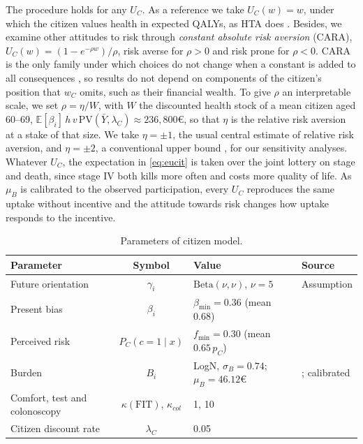 \documentclass[12pt]{article}
\begin{document}
The procedure holds for any $U_C$. As a reference we take $U_C(w) = w$, under which the citizen values health in expected QALYs, as HTA does \citep{pliskin1980utility, bleichrodt1997characterizing}. Besides, we examine other attitudes to risk through \emph{constant absolute risk aversion} (CARA), $U_C(w) = (1 - e^{-\rho w})/\rho$, risk averse for $\rho > 0$ and risk prone for $\rho < 0$. CARA is the only family under which choices do not change when a constant is added to all consequences \citep{pratt1978risk}, so results do not depend on components of the citizen's position that $w_C$ omits, such as their financial wealth. To give $\rho$ an interpretable scale, we set $\rho = \eta / W$, with $W$ the discounted health stock of a mean citizen aged 60--69, $\mathbb{E}[\beta_i]\, h\, v\, \mathrm{PV}(\bar Y, \lambda_C) \approx 236{,}800$€, so that $\eta$ is the relative risk aversion at a stake of that size. We take $\eta = \pm 1$, the usual central estimate of relative risk aversion, and $\eta = \pm 2$, a conventional upper bound \citep{chetty2006new}, for our sensitivity analyses. Whatever $U_C$, the expectation in \eqref{eq:eucit} is taken over the joint lottery on stage and death, since stage IV both kills more often and costs more quality of life. As $\mu_B$ is calibrated to the observed participation, every $U_C$ reproduces the same uptake without incentive and the attitude towards risk changes how uptake responds to the incentive.






\begin{table}[htbp]
\centering
\footnotesize
\caption{Parameters of citizen model.}
\label{tab:citizen_params}
\begin{tabular}{l c l l}
\toprule
\textbf{Parameter} & \textbf{Symbol} & \textbf{Value} & \textbf{Source} \\
\midrule
Future orientation & $\gamma_i$ & $\mathrm{Beta}(\nu,\nu)$, $\nu = 5$ & Assumption \\
Present bias & $\beta_i$ & $\beta_{\min} = 0.36$ (mean 0.68) & \citealp{cheung2026meta} \\
Perceived risk & $P_C(c=1\mid x)$ & $f_{\min} = 0.30$ (mean $0.65\,p_{C}$) & \citealp{le2023exploring} \\
Burden & $B_i$ & LogN, $\sigma_B = 0.74$; $\mu_B = 46.12$€ & \citealp{jonas2010willingness}; calibrated \\
Comfort, test and colonoscopy & $\kappa(\text{FIT})$, $\kappa_{col}$ & 1, 10 & \cite{jonas2007patient} \\
Citizen discount rate & $\lambda_C$ & 0.05 & \cite{mahboub2014stated} \\
\bottomrule
\end{tabular}
\end{table}
\end{document}
